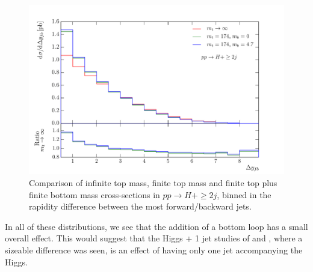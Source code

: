 \begin{figure}[t]
\centering
\includegraphics[scale=0.64]{Images/Higgs_Plots/dyfb_compare_all.pdf}
\caption{Comparison of infinite top mass, finite top mass and finite top plus finite bottom mass cross-sections in $pp \to H+\geq2j$, binned in the rapidity difference between the most forward/backward jets.}
\label{fig:hjj_dy}
\end{figure}

In all of these distributions, we see that the addition of a bottom loop has a small overall effect. This would suggest that the Higgs + 1 jet studies of \cite{Lindert2017} and \cite{Grazzini2013}, where a sizeable difference was seen, is an effect of having only one jet accompanying the Higgs. 


